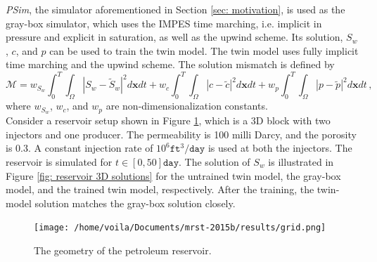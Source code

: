 \emph{PSim}, the simulator aforementioned in Section \ref{sec: motivation}, is
used as the gray-box simulator, which uses the IMPES time marching, i.e. implicit in pressure
and explicit in saturation, as well as the upwind scheme.
Its solution, $S_w$, $c$, and $p$ can be used to train the 
twin model. The twin model uses fully implicit time marching and the upwind scheme.
The solution mismatch is defined by
\begin{equation}
    \mathcal{M} = w_{S_w}\int_0^T\int_\Omega |S_w-\tilde{S}_w|^2 d\boldsymbol{x} dt
                + w_{c}\int_0^T\int_\Omega |c-\tilde{c}|^2 d\boldsymbol{x} dt 
                + w_{p}\int_{0}^T\int_\Omega |p-\tilde{p}|^2 d\boldsymbol{x} dt\,,
    \label{eqn: polymer sol mismatch}
\end{equation}
where $w_{S_w}$, $w_c$, and $w_p$ are non-dimensionalization constants.\\


Consider a reservoir setup shown in Figure \ref{fig: reservoir 3D mesh}, which
is a 3D block with two injectors and one producer. The permeability
is 100 milli Darcy, and the porosity is 0.3. A constant injection rate of $10^6 
\texttt{ft}^3/\texttt{day}$ is used at both the injectors.
The reservoir is simulated for $t\in [0,50] \texttt{day}$.
The solution of $S_w$ is illustrated in Figure \ref{fig: reservoir 3D solutions} for the untrained 
twin model, the gray-box model, and the trained twin model, respectively. 
After the training, the twin-model solution matches the gray-box solution closely.\\

\begin{figure}[htbp]
    \begin{center}
        \texttt{[image: /home/voila/Documents/mrst-2015b/results/grid.png]}
        \caption{The geometry of the petroleum reservoir.}
        \label{fig: reservoir 3D mesh}
    \end{center}
\end{figure}

